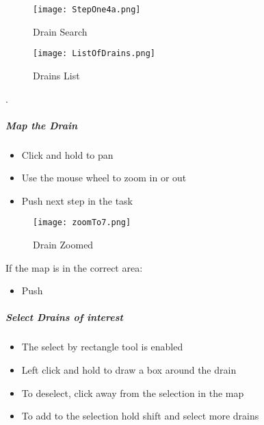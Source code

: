 \begin{figure}[h!]
 \centering
     \texttt{[image: StepOne4a.png]}
 \caption{Drain Search}
 \end{figure}

\clearpage

 \begin{wrapfigure}{r}{0.5\textwidth}
 \centering
     \texttt{[image: ListOfDrains.png]}
 \caption{Drains List}
   \end{wrapfigure}
.

\vspace{1.5in}

\vspace{.5in}
 


\clearpage

\subparagraph{Map the Drain}

\begin{itemize}

\item Click and hold to pan

\item Use the mouse wheel to zoom in or out

\item Push next step in the task

\end{itemize}

\begin{figure}[h!]
 \centering
     \texttt{[image: zoomTo7.png]}
 \caption{Drain Zoomed}


 \end{figure}

If the map is in the correct area:

\begin{itemize}

\item Push \bigbtn {}

\end{itemize}

\clearpage

\subparagraph{Select Drains of interest}

\begin{itemize}

\item The select by rectangle tool is enabled

\item Left click and hold to draw a box around the drain

\item To deselect, click away from the selection in the map

\item To add to the selection hold shift and select more drains

\end{itemize}

